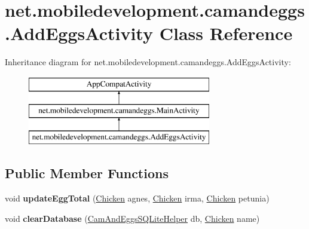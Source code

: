 \hypertarget{classnet_1_1mobiledevelopment_1_1camandeggs_1_1_add_eggs_activity}{}\section{net.\+mobiledevelopment.\+camandeggs.\+Add\+Eggs\+Activity Class Reference}
\label{classnet_1_1mobiledevelopment_1_1camandeggs_1_1_add_eggs_activity}
Inheritance diagram for net.\+mobiledevelopment.\+camandeggs.\+Add\+Eggs\+Activity\+:\begin{figure}[H]
\begin{center}
\leavevmode
\includegraphics[height=3.000000cm]{classnet_1_1mobiledevelopment_1_1camandeggs_1_1_add_eggs_activity}
\end{center}
\end{figure}
\subsection*{Public Member Functions}
\begin{DoxyCompactItemize}
\item 
\mbox{\label{classnet_1_1mobiledevelopment_1_1camandeggs_1_1_add_eggs_activity_a37b55b93ec8017a493248137bdd463c6}} 
void {\bfseries update\+Egg\+Total} (\hyperlink{classnet_1_1mobiledevelopment_1_1camandeggs_1_1_chicken}{Chicken} agnes, \hyperlink{classnet_1_1mobiledevelopment_1_1camandeggs_1_1_chicken}{Chicken} irma, \hyperlink{classnet_1_1mobiledevelopment_1_1camandeggs_1_1_chicken}{Chicken} petunia)
\item 
\mbox{\label{classnet_1_1mobiledevelopment_1_1camandeggs_1_1_add_eggs_activity_a62dac758d87fac73409199fcaee39b93}} 
void {\bfseries clear\+Database} (\hyperlink{classnet_1_1mobiledevelopment_1_1camandeggs_1_1_cam_and_eggs_s_q_lite_helper}{Cam\+And\+Eggs\+S\+Q\+Lite\+Helper} db, \hyperlink{classnet_1_1mobiledevelopment_1_1camandeggs_1_1_chicken}{Chicken} name)
\end{DoxyCompactItemize}
